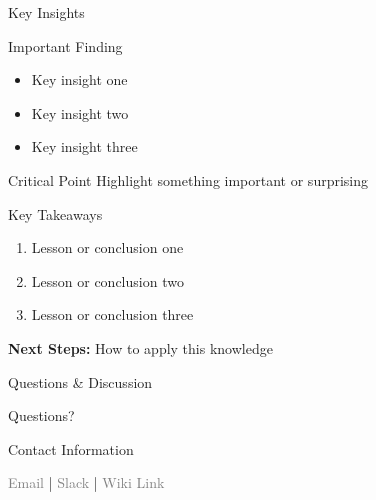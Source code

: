 \documentclass[aspectratio=169, xcolor=table]{beamer}
\begin{document}

%
%   
%


\begin{frame}{Key Insights}
	\begin{block}{Important Finding}
		\begin{itemize}
			\item Key insight one
			\item Key insight two
			\item Key insight three
		\end{itemize}
	\end{block}

	\vspace{1em}
	\begin{alertblock}{Critical Point}
		Highlight something important or surprising
	\end{alertblock}
\end{frame}


\begin{frame}{Key Takeaways}
	\begin{enumerate}
		\item Lesson or conclusion one
		\item Lesson or conclusion two
		\item Lesson or conclusion three
	\end{enumerate}

	\vspace{1.5em}
	{\textcolor{PrimaryAccent}{\textbf{Next Steps:}} How to apply this knowledge}
\end{frame}

\begin{frame}{Questions \& Discussion}
	\begin{center}
		\vspace{2em}
		\Huge \textcolor{PrimaryAccent}{Questions?}
		\vspace{2em}

		{\large Contact Information}
		\vspace{0.5em}

		{\small \textcolor{gray}{Email} | \textcolor{gray}{Slack} | \textcolor{gray}{Wiki Link}}
	\end{center}
\end{frame}
\end{document}
